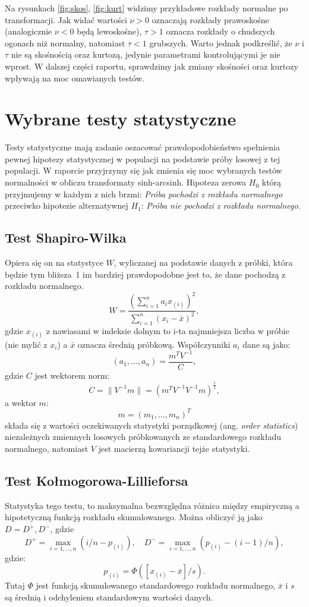 \documentclass{article}
\theoremstyle{break}
\begin{document}
Na rysunkach \ref{fig:skos}, \ref{fig:kurt} widzimy przykładowe rozkłady normalne po transformacji. Jak widać wartości $\nu > 0$ oznaczają rozkłady prawoskośne (analogicznie $\nu < 0$ będą lewoskośne), $\tau > 1$ oznacza rozkłady o chudszych ogonach niż normalny, natomiast $\tau < 1$ grubszych. Warto jednak podkreślić, że $\nu$ i $\tau$ nie są skośnością oraz kurtozą, jedynie parametrami kontrolującymi je nie wprost.
	W dalszej części raportu, sprawdzimy jak zmiany skośności oraz kurtozy wpływają na moc omawianych testów.
	
	\section{Wybrane testy statystyczne}
	Testy statystyczne mają zadanie oszacować prawdopodobieństwo spełnienia pewnej hipotezy statystycznej w populacji na podstawie próby losowej z tej populacji. W raporcie przyjrzymy się jak zmienia się moc wybranych testów normalności w obliczu transformaty sinh-arcsinh. Hipoteza zerowa $H_0$ którą przyjmujemy w każdym z nich brzmi: \textit{Próba pochodzi z rozkładu normalnego} przeciwko  hipotezie alternatywnej $H_1$: \textit{Próba nie pochodzi z rozkładu normalnego}.
	\subsection*{Test Shapiro-Wilka}
	Opiera się on na statystyce $W$, wyliczanej na podstawie danych z próbki, która będzie tym bliższa~1 im bardziej prawdopodobne jest to, że dane pochodzą z rozkładu normalnego.
	$$W = \frac{(\sum_{i=1}^{n}a_i x_{(i)})^2}{\sum_{i=1}^{n} (x_i - \bar{x})^2},$$
	gdzie $x_{{(i)}}$ z nawiasami w indeksie dolnym to i-ta najmniejsza liczba w próbie (nie mylić z $x_{i}$) a $\bar{x}$ oznacza średnią próbkową. Współczynniki $a_i$ dane są jako:
	$$(a_1, \dots, a_n) = \frac{m^T V^{-1}}{C},$$
	 gdzie $C$ jest wektorem norm:
	 $$C = \|V^{-1} m\| = (m^T V^{-1} V^{-1} m)^{\frac{1}{2}},$$
	 a wektor $m$:
	 $$m = (m_1,\dots,m_n)^T$$
	składa się z wartości oczekiwanych statystyki porządkowej (ang. \textit{order statistics}) niezależnych zmiennych losowych próbkowanych ze standardowego rozkładu normalnego, natomiast $V$ jest macierzą kowariancji tejże statystyki.
	
	\subsection*{Test Kołmogorowa-Lillieforsa}
	Statystyka tego testu, to maksymalna bezwzględna różnica między empiryczną a hipotetyczną funkcją rozkładu skumulowanego. Można obliczyć ją jako $D = D^+, D^-$, gdzie
	$$D^{+} = \max_{i=1,..., n}(i/n - p_{(i)}),\quad D^{-} = \max_{i=1,..., n}(p_{(i)} - (i-1)/n),$$
	gdzie: $$p_{(i)} = \Phi([x_{(i)} - \overline{x}]/s).$$ Tutaj $\Phi$ jest funkcją skumulowanego standardowego rozkładu normalnego, $\bar{x}$ i $s$ są średnią i odchyleniem standardowym wartości danych. 
\end{document}
